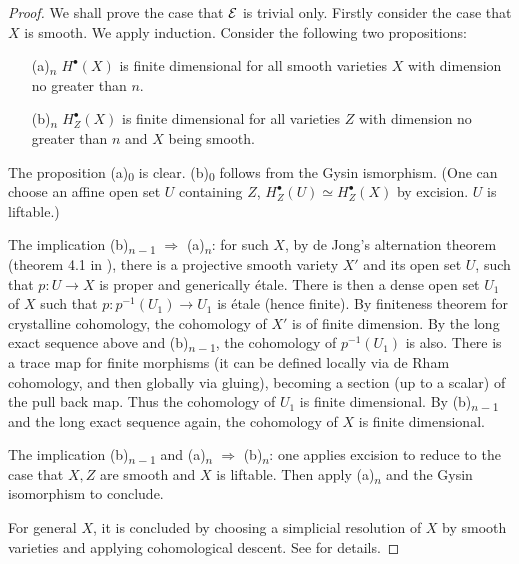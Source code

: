 \begin{proof}
    We shall prove the case that ${\mathcal {E}}$ is trivial only. 
    Firstly consider the case that $X$ is smooth. 
    We apply induction. Consider the following two propositions:
    \begin{itemize}
        \item [(a)\textsubscript{$n$}] 
            $H^\bullet(X)$ is finite dimensional for all smooth varieties $X$ 
            with dimension no greater than $n$.
        \item [(b)\textsubscript{$n$}] 
            $H^\bullet_Z(X)$ is finite dimensional for all varieties $Z$ 
            with dimension no greater than $n$ and $X$ being smooth.
    \end{itemize}
    The proposition (a)\textsubscript{$0$} is clear. 
    (b)\textsubscript{$0$} follows from the Gysin ismorphism. 
    (One can choose an affine open set $U$ containing $Z$, 
    $H^\bullet_Z(U) \simeq H^\bullet_Z(X)$ by excision. $U$ is liftable.)

    The implication (b)\textsubscript{$n-1$} $\Rightarrow$ (a)\textsubscript{$n$}: 
    for such $X$, by de Jong's alternation theorem (theorem 4.1 in \cite{dJ}), 
    there is a projective smooth variety $X'$ and its open set $U$, 
    such that $p \colon U \to X$ is proper and generically \'etale. 
    There is then a dense open set $U_1$ of $X$ such that 
    $p \colon p^{-1}(U_1) \to U_1$ is \'etale (hence finite). 
    By finiteness theorem for crystalline cohomology, 
    the cohomology of $X'$ is of finite dimension. 
    By the long exact sequence above and (b)\textsubscript{$n-1$}, 
    the cohomology of $p^{-1}(U_1)$ is also. 
    There is a trace map for finite morphisms 
    (it can be defined locally via de Rham cohomology, and then globally via gluing), 
    becoming a section (up to a scalar) of the pull back map. 
    Thus the cohomology of $U_1$ is finite dimensional. 
    By (b)\textsubscript{$n-1$} and the long exact sequence again, 
    the cohomology of $X$ is finite dimensional.

    The implication (b)\textsubscript{$n-1$} and 
    (a)\textsubscript{$n$} $\Rightarrow$ (b)\textsubscript{$n$}: 
    one applies excision to reduce to the case that $X, Z$ are smooth and $X$ is liftable. 
    Then apply (a)\textsubscript{$n$} and the Gysin isomorphism to conclude.

    For general $X$, it is concluded by choosing a simplicial resolution of $X$ 
    by smooth varieties and applying cohomological descent. 
    See \cite{Tsu} for details. 
\end{proof}

